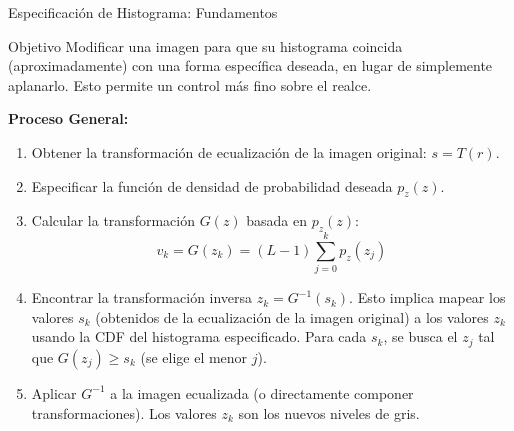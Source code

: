 \documentclass{beamer}
\begin{document}
\begin{frame}{Especificación de Histograma: Fundamentos}\footnotesize
    \begin{block}{Objetivo}
        Modificar una imagen para que su histograma coincida (aproximadamente) con una forma específica deseada, en lugar de simplemente aplanarlo. Esto permite un control más fino sobre el realce.
    \end{block}
    \textbf{Proceso General:}
    \begin{enumerate}
        \item Obtener la transformación de ecualización de la imagen original: $s = T(r)$.
        \item Especificar la función de densidad de probabilidad deseada $p_z(z)$.
        \item Calcular la transformación $G(z)$ basada en $p_z(z)$:
              \begin{equation}
                  v_k = G(z_k) = (L-1) \sum_{j=0}^{k} p_z(z_j) \label{eq:hist_spec_G}
              \end{equation}
        \item Encontrar la transformación inversa $z_k = G^{-1}(s_k)$. Esto implica mapear los valores $s_k$ (obtenidos de la ecualización de la imagen original) a los valores $z_k$ usando la CDF del histograma especificado. Para cada $s_k$, se busca el $z_j$ tal que $G(z_j) \ge s_k$ (se elige el menor $j$).
        \item Aplicar $G^{-1}$ a la imagen ecualizada (o directamente componer transformaciones). Los valores $z_k$ son los nuevos niveles de gris.
    \end{enumerate}
\end{frame}
\end{document}
